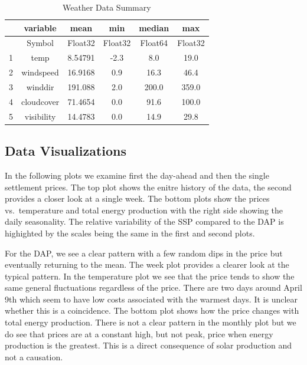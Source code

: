 \documentclass[
  journal,
]{IEEEtran}%
\begin{document}
\label{weather-data-summary}
\begin{table}
\caption{Weather Data Summary}\tabularnewline

\centering
\begin{tabular}{r|ccccc}
    & variable & mean & min & median & max\\
    \hline
    & Symbol & Float32 & Float32 & Float64 & Float32\\
    \hline
    1 & temp & 8.54791 & -2.3 & 8.0 & 19.0 \\
    2 & windspeed & 16.9168 & 0.9 & 16.3 & 46.4 \\
    3 & winddir & 191.088 & 2.0 & 200.0 & 359.0 \\
    4 & cloudcover & 71.4654 & 0.0 & 91.6 & 100.0 \\
    5 & visibility & 14.4783 & 0.0 & 14.9 & 29.8 \\
\end{tabular}
\end{table}

\subsection{Data Visualizations}\label{data-visualizations}

In the following plots we examine first the day-ahead and then the
single settlement prices. The top plot shows the enitre history of the
data, the second provides a closer look at a single week. The bottom
plots show the prices vs.~temperature and total energy production with
the right side showing the daily seasonality. The relative variability
of the SSP compared to the DAP is highighted by the scales being the
same in the first and second plots.

For the DAP, we see a clear pattern with a few random dips in the price
but eventually returning to the mean. The week plot provides a clearer
look at the typical pattern. In the temperature plot we see that the
price tends to show the same general fluctuations regardless of the
price. There are two days around April 9th which seem to have low costs
associated with the warmest days. It is unclear whether this is a
coincidence. The bottom plot shows how the price changes with total
energy production. There is not a clear pattern in the monthly plot but
we do see that prices are at a constant high, but not peak, price when
energy production is the greatest. This is a direct consequence of solar
production and not a causation.
\end{document}
